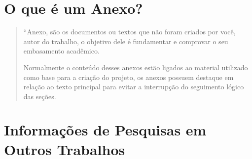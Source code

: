 \begin{anexosenv}

\partanexos

\chapter{O que é um Anexo?}

\begin{quote}\small
``Anexo, são os documentos ou textos que não foram criados por você, autor do trabalho, o objetivo dele é fundamentar e comprovar o seu embasamento acadêmico.

Normalmente o conteúdo desses anexos estão ligados ao material utilizado como base para a criação do projeto, os anexos possuem destaque em relação ao texto principal para evitar a interrupção do seguimento lógico das seções.
\cite{guia}

\end{quote}

\lipsum[11]

\chapter{Informações de Pesquisas em Outros Trabalhos}

\lipsum[31]


\end{anexosenv}